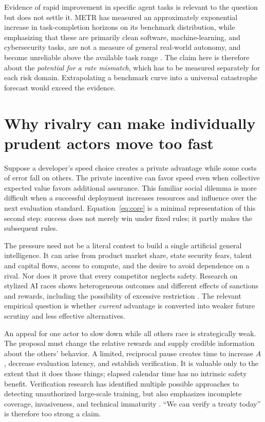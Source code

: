 \documentclass[11pt]{article}
\begin{document}
Evidence of rapid improvement in specific agent tasks is relevant to the question but does not settle it. METR has measured an approximately exponential increase in task-completion horizons on its benchmark distribution, while emphasizing that these are primarily clean software, machine-learning, and cybersecurity tasks, are not a measure of general real-world autonomy, and become unreliable above the available task range \cite{metr2025,metr2026}. The claim here is therefore about the \emph{potential for a rate mismatch}, which has to be measured separately for each risk domain. Extrapolating a benchmark curve into a universal catastrophe forecast would exceed the evidence.

\section{Why rivalry can make individually prudent actors move too fast}

Suppose a developer's speed choice creates a private advantage while some costs of error fall on others. The private incentive can favor speed even when collective expected value favors additional assurance. This familiar social dilemma is more difficult when a successful deployment increases resources and influence over the next evaluation standard. Equation~\eqref{eq:core} is a minimal representation of this second step: success does not merely win under fixed rules; it partly makes the subsequent rules.

The pressure need not be a literal contest to build a single artificial general intelligence. It can arise from product market share, state security fears, talent and capital flows, access to compute, and the desire to avoid dependence on a rival. Nor does it prove that every competitor neglects safety. Research on stylized AI races shows heterogeneous outcomes and different effects of sanctions and rewards, including the possibility of excessive restriction \cite{han2021,cimpeanu2022}. The relevant empirical question is whether \emph{current} advantage is converted into weaker future scrutiny and less effective alternatives.

An appeal for one actor to slow down while all others race is strategically weak. The proposal must change the relative rewards and supply credible information about the others' behavior. A limited, reciprocal pause creates time to increase $A$, decrease evaluation latency, and establish verification. It is valuable only to the extent that it does those things; elapsed calendar time has no intrinsic safety benefit. Verification research has identified multiple possible approaches to detecting unauthorized large-scale training, but also emphasizes incomplete coverage, invasiveness, and technical immaturity \cite{wasil2024,verification2025}. ``We can verify a treaty today'' is therefore too strong a claim.
\end{document}
